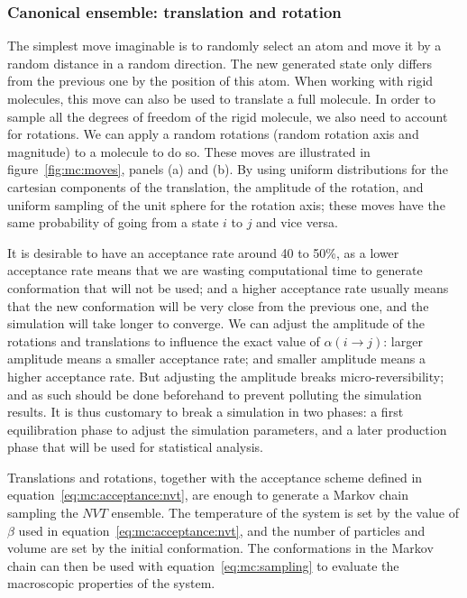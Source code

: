 \documentclass[thesis]{subfiles}
\begin{document}
\subsubsection{Canonical ensemble: translation and rotation}

The simplest move imaginable is to randomly select an atom and move it by a
random distance in a random direction. The new generated state only differs from
the previous one by the position of this atom. When working with rigid
molecules, this move can also be used to translate a full molecule. In order to
sample all the degrees of freedom of the rigid molecule, we also need to account
for rotations. We can apply a random rotations (random rotation axis and
magnitude) to a molecule to do so. These moves are illustrated in
figure~\ref{fig:mc:moves}, panels (a) and (b). By using uniform distributions
for the cartesian components of the translation, the amplitude of the rotation,
and uniform sampling of the unit sphere for the rotation axis; these moves have
the same probability of going from a state $i$ to $j$ and vice versa.

It is desirable to have an acceptance rate around 40 to 50\%, as a lower
acceptance rate means that we are wasting computational time to generate
conformation that will not be used; and a higher acceptance rate usually means
that the new conformation will be very close from the previous one, and the
simulation will take longer to converge. We can adjust the amplitude of the
rotations and translations to influence the exact value of $\alpha(i \to j)$:
larger amplitude means a smaller acceptance rate; and smaller amplitude means a
higher acceptance rate. But adjusting the amplitude breaks micro-reversibility;
and as such should be done beforehand to prevent polluting the simulation
results. It is thus customary to break a simulation in two phases: a first
equilibration phase to adjust the simulation parameters, and a later production
phase that will be used for statistical analysis.

Translations and rotations, together with the acceptance scheme defined in
equation~\eqref{eq:mc:acceptance:nvt}, are enough to generate a Markov chain
sampling the $NVT$ ensemble. The temperature of the system is set by the value
of $\beta$ used in equation~\eqref{eq:mc:acceptance:nvt}, and the number of
particles and volume are set by the initial conformation. The conformations in
the Markov chain can then be used with equation~\eqref{eq:mc:sampling} to
evaluate the macroscopic properties of the system.
\end{document}
